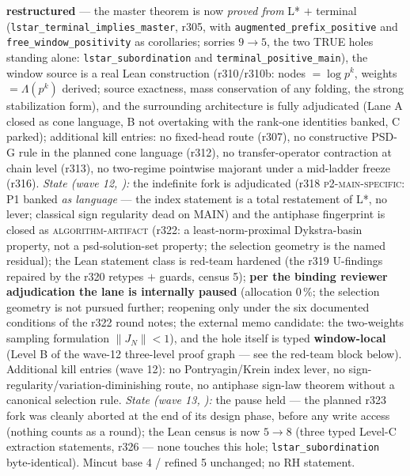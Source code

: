 \documentclass[11pt,a4paper]{article}
\begin{document}
{\textbf{restructured} --- the master theorem is now \emph{proved
from} L* $+$ terminal
(\texttt{lstar\_terminal\_implies\_master}, r305, with
\texttt{augmented\_prefix\_positive} and
\texttt{free\_window\_positivity} as corollaries; sorries $9 \to
5$, the two TRUE holes standing alone:
\texttt{lstar\_subordination} and
\texttt{terminal\_positive\_main}), the window source is a real
Lean construction (r310/r310b: nodes $= \log p^k$, weights $=
\Lambda(p^k)$ derived; source exactness, mass conservation of any
folding, the strong stabilization form), and the surrounding
architecture is fully adjudicated (Lane A closed as cone language,
B not overtaking with the rank-one identities banked, C parked);
additional kill entries: no fixed-head route (r307), no
constructive PSD-G rule in the planned cone language (r312), no
transfer-operator contraction at chain level (r313), no two-regime
pointwise majorant under a mid-ladder freeze (r316).
\emph{State (wave 12, ):} the
indefinite fork is adjudicated (r318 \textsc{p2-main-specific}: P1
banked \emph{as language} --- the index statement is a total
restatement of L*, no lever; classical sign regularity dead on
MAIN) and the antiphase fingerprint is closed as
\textsc{algorithm-artifact} (r322: a least-norm-proximal
Dykstra-basin property, not a psd-solution-set property; the
selection geometry is the named residual); the Lean statement
class is red-team hardened (the r319 U-findings repaired by the
r320 retypes $+$ guards, census 5); \textbf{per the binding
reviewer adjudication the lane is internally paused} (allocation
0\,\%; the selection geometry is not pursued further; reopening
only under the six documented conditions of the r322 round notes;
the external memo candidate: the two-weights sampling formulation
$\lVert J_N\rVert < 1$), and the hole itself is typed
\textbf{window-local} (Level B of the wave-12 three-level proof
graph --- see the red-team block below).  Additional kill entries
(wave 12): no Pontryagin/Krein index lever, no
sign-regularity/variation-diminishing route, no antiphase sign-law
theorem without a canonical selection rule.
\emph{State (wave 13, ):}
the pause held --- the planned r323 fork was cleanly aborted at the
end of its design phase, before any write access (nothing counts as
a round); the Lean census is now $5 \to 8$ (three typed Level-C
extraction statements, r326 --- none touches this hole;
\texttt{lstar\_subordination} byte-identical).  Mincut
base 4 / refined 5 unchanged; no RH statement.\par}
\end{document}

